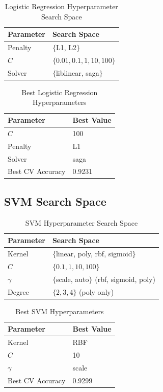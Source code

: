 \documentclass[12pt,a4paper]{article}
\begin{document}
\begin{table}[H]
\centering
\begin{tabular}{ll}
\toprule
Parameter & Search Space \\
\midrule
Penalty & $\{$L1, L2$\}$ \\
$C$ & $\{0.01, 0.1, 1, 10, 100\}$ \\
Solver & $\{$liblinear, saga$\}$ \\
\bottomrule
\end{tabular}
\caption{Logistic Regression Hyperparameter Search Space}
\end{table}

\begin{table}[H]
\centering
\begin{tabular}{ll}
\toprule
Parameter & Best Value \\
\midrule
$C$ & 100 \\
Penalty & L1 \\
Solver & saga \\
Best CV Accuracy & 0.9231 \\
\bottomrule
\end{tabular}
\caption{Best Logistic Regression Hyperparameters}
\end{table}

\subsection*{SVM Search Space}

\begin{table}[H]
\centering
\begin{tabular}{ll}
\toprule
Parameter & Search Space \\
\midrule
Kernel & $\{$linear, poly, rbf, sigmoid$\}$ \\
$C$ & $\{0.1, 1, 10, 100\}$ \\
$\gamma$ & $\{$scale, auto$\}$ (rbf, sigmoid, poly) \\
Degree & $\{2, 3, 4\}$ (poly only) \\
\bottomrule
\end{tabular}
\caption{SVM Hyperparameter Search Space}
\end{table}

\begin{table}[H]
\centering
\begin{tabular}{ll}
\toprule
Parameter & Best Value \\
\midrule
Kernel & RBF \\
$C$ & 10 \\
$\gamma$ & scale \\
Best CV Accuracy & 0.9299 \\
\bottomrule
\end{tabular}
\caption{Best SVM Hyperparameters}
\end{table}
\end{document}
